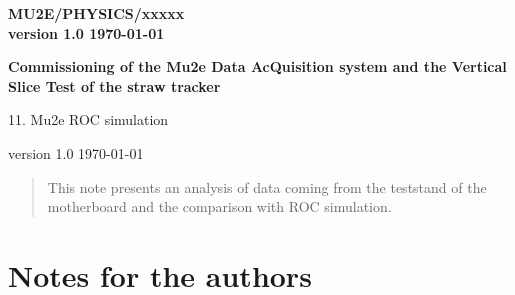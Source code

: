 \documentclass[12pt]{article}
\begin{document}
\begin{titlepage}
  \begin{flushright}
    \bf {MU2E/PHYSICS/xxxxx} \\
    version 1.0
    \today
 \end{flushright}

  \vspace{1cm}

  \begin{center}
    {\Large \bf Commissioning of the Mu2e Data AcQuisition system and the Vertical Slice Test of the straw tracker

      \vspace{0.3in}

      11. Mu2e ROC simulation
    }

    \vspace{1cm}

   
    version 1.0
    \today
 \end{center}

  \begin{abstract}
    This note presents an analysis of data coming from the teststand of the motherboard and the comparison with ROC simulation.
    \vspace{0.2in}
  \end{abstract}

\end{titlepage}
%
%
%
{\tableofcontents}

% 

\newpage
\section {Notes for the authors}
\end{document}
